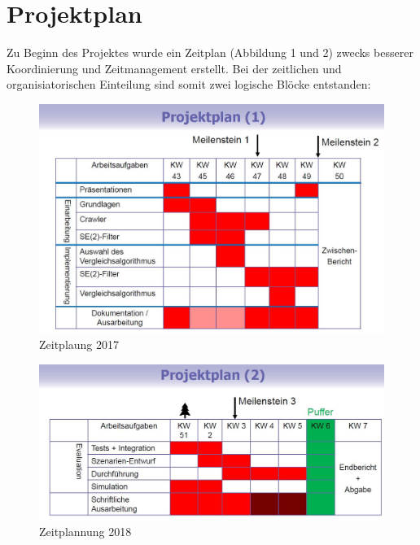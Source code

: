 \section{Projektplan}
Zu Beginn des Projektes wurde ein Zeitplan (Abbildung 1 und 2) zwecks besserer Koordinierung und Zeitmanagement erstellt.
Bei der zeitlichen und organisiatorischen Einteilung sind somit zwei logische Blöcke entstanden:
\begin{figure}
	\centering
	\includegraphics[width=0.9\linewidth]{Images/tu1}
	\caption{Zeitplaung 2017}
	\label{fig:tu}
\end{figure}

\begin{figure}[H]
	\centering
	\includegraphics[width=0.9\linewidth]{Images/tu2}
	\caption{Zeitplannung 2018}
	\label{fig:tu2}
\end{figure}
